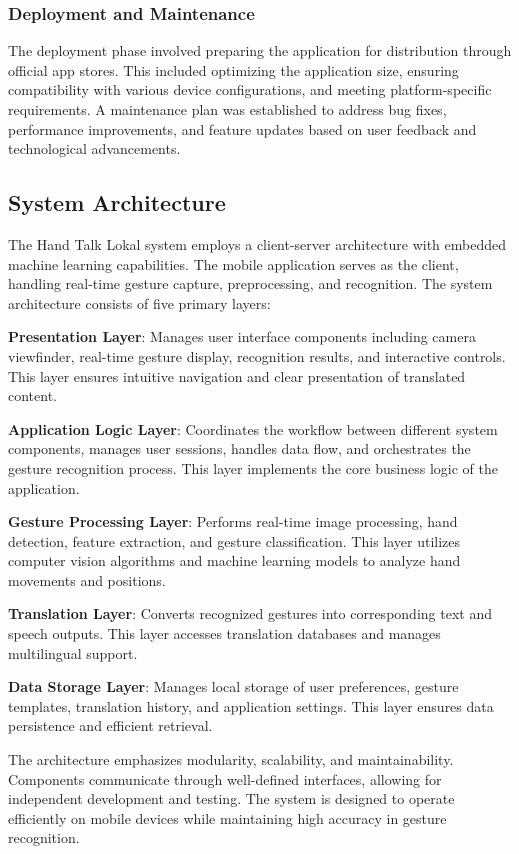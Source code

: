 \documentclass[12pt]{article}
\begin{document}
\subsubsection{Deployment and Maintenance}

The deployment phase involved preparing the application for distribution through official app stores. This included optimizing the application size, ensuring compatibility with various device configurations, and meeting platform-specific requirements. A maintenance plan was established to address bug fixes, performance improvements, and feature updates based on user feedback and technological advancements.

\subsection{System Architecture}

The Hand Talk Lokal system employs a client-server architecture with embedded machine learning capabilities. The mobile application serves as the client, handling real-time gesture capture, preprocessing, and recognition. The system architecture consists of five primary layers:

\textbf{Presentation Layer}: Manages user interface components including camera viewfinder, real-time gesture display, recognition results, and interactive controls. This layer ensures intuitive navigation and clear presentation of translated content.

\textbf{Application Logic Layer}: Coordinates the workflow between different system components, manages user sessions, handles data flow, and orchestrates the gesture recognition process. This layer implements the core business logic of the application.

\textbf{Gesture Processing Layer}: Performs real-time image processing, hand detection, feature extraction, and gesture classification. This layer utilizes computer vision algorithms and machine learning models to analyze hand movements and positions.

\textbf{Translation Layer}: Converts recognized gestures into corresponding text and speech outputs. This layer accesses translation databases and manages multilingual support.

\textbf{Data Storage Layer}: Manages local storage of user preferences, gesture templates, translation history, and application settings. This layer ensures data persistence and efficient retrieval.

The architecture emphasizes modularity, scalability, and maintainability. Components communicate through well-defined interfaces, allowing for independent development and testing. The system is designed to operate efficiently on mobile devices while maintaining high accuracy in gesture recognition.
\end{document}
